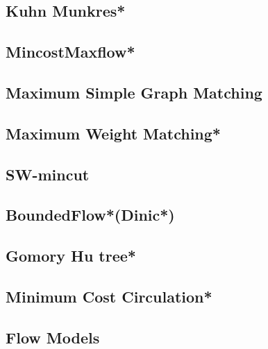 \subsection{Kuhn Munkres*} %

\subsection{MincostMaxflow*} %

\subsection{Maximum Simple Graph Matching} %

\subsection{Maximum Weight Matching*} %

\subsection{SW-mincut}

\subsection{BoundedFlow*(Dinic*)} %

\subsection{Gomory Hu tree*} %

\subsection{Minimum Cost Circulation*} %

\subsection{Flow Models}

% 
